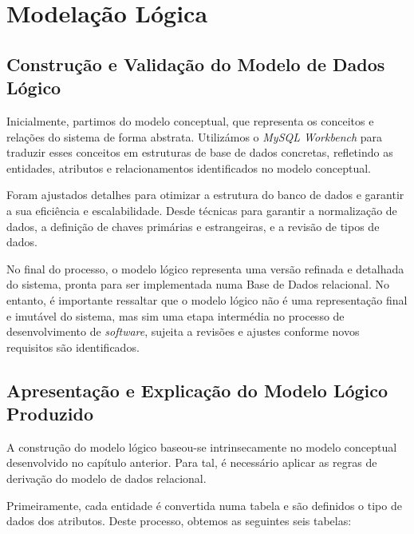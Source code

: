 \documentclass[a4paper,12pt]{scrreprt}
\begin{document}
\chapter{Modelação Lógica}
    \label{sec:model_logica}

    \section{Construção e Validação do Modelo de Dados Lógico}

        Inicialmente, partimos do modelo conceptual, que representa os conceitos e relações do sistema de forma abstrata. Utilizámos o \textit{MySQL Workbench} para traduzir esses conceitos em estruturas de base de dados concretas, refletindo as entidades, atributos e relacionamentos identificados no modelo conceptual.

        Foram ajustados detalhes para otimizar a estrutura do banco de dados e garantir a sua eficiência e escalabilidade. Desde técnicas para garantir a normalização de dados, a definição de chaves primárias e estrangeiras, e a revisão de tipos de dados.
    
        No final do processo, o modelo lógico representa uma versão refinada e detalhada do sistema, pronta para ser implementada numa Base de Dados relacional. No entanto, é importante ressaltar que o modelo lógico não é uma representação final e imutável do sistema, mas sim uma etapa intermédia no processo de desenvolvimento de \textit{software}, sujeita a revisões e ajustes conforme novos requisitos são identificados.
        
    \clearpage
        
    \section{Apresentação e Explicação do Modelo Lógico Produzido}
        
        A construção do modelo lógico baseou-se intrinsecamente no modelo conceptual desenvolvido no capítulo anterior. Para tal, é necessário aplicar as regras de derivação do modelo de dados relacional.

        Primeiramente, cada entidade é convertida numa tabela e são definidos o tipo de dados dos atributos. Deste processo, obtemos as seguintes seis tabelas:
\end{document}
